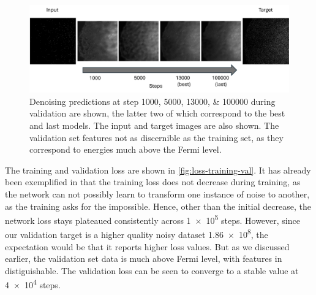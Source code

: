 \begin{figure}
    \centering
    \includegraphics[width=1\linewidth]{images/val_over_time.pdf}
    \caption{Denoising predictions at step \numlist{1000;5000;13000;100000} during validation are shown, the latter two of which correspond to the best and last models. The input and target images are also shown. The validation set features not as discernible as the training set, as they correspond to energies much above the Fermi level.}
    \label{fig:val-progress-example}
\end{figure}

The training and validation loss are shown in \cref{fig:loss-training-val}. It has already been exemplified in \cite{lehtinenNoise2NoiseLearningImage2018} that the training loss does not decrease during training, as the network can not possibly learn to transform one instance of noise to another, as the training asks for the impossible. Hence, other than the initial decrease, the network loss stays plateaued consistently across \num{1e5} steps. However, since our validation target is a higher quality noisy dataset \num{1.86e8}, the expectation would be that it reports higher loss values. But as we discussed earlier, the validation set data is much above Fermi level, with features in distiguishable. The validation loss can be seen to converge to a stable value at \num{4e4} steps. 

